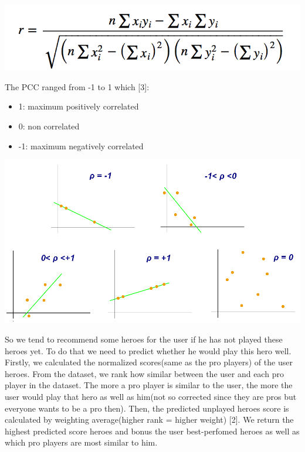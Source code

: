 \begin{center}
    \includegraphics[scale=0.25]{./fig/PCC.png}
\end{center}

\noindent The PCC ranged from -1 to 1 which [3]:
\begin{itemize}
    \item 1: maximum positively correlated
    \item 0: non correlated
    \item -1: maximum negatively correlated
\end{itemize}

\begin{center}
    \includegraphics[scale=0.4]{./fig/Correlation_coefficient.png}
\end{center}

\noindent So we tend to recommend some heroes for the user if he has not played these heroes yet. To do that we need to predict whether he would play this hero well. Firstly, we calculated the normalized scores(same as the pro players) of the user heroes. From the dataset, we rank how similar between the user and each pro player in the dataset. The more a pro player is similar to the user, the more the user would play that hero as well as him(not so corrected since they are pros but everyone wants to be a pro then). Then, the predicted unplayed heroes score is calculated by weighting average(higher rank = higher weight) [2]. We return the highest predicted score heroes and bonus the user best-perfomed heroes as well as which pro players are most similar to him.



